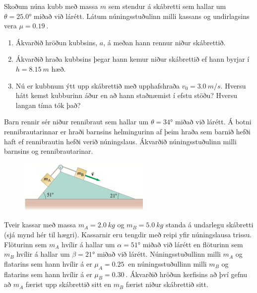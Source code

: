 \begin{enumerate}[label = \textbf{Dæmi \thechapter.\arabic*.}]
\item Skoðum núna kubb með massa $m$ sem stendur á skábretti sem hallar um $\theta = \ang{25.0}$ miðað við lárétt. Látum núningsstuðulinn milli kassans og undirlagsins vera $\mu = \SI{0.19}{}$.
\begin{enumerate}[label = \textbf{(\alph*)}]
    \item Ákvarðið hröðun kubbsins, $a$, á meðan hann rennur niður skábrettið.
    
    \item Ákvarðið hraða kubbsins þegar hann kemur niður skábrettið ef hann byrjar í $h = \SI{8.15}{m}$ hæð.
    
    \item Nú er kubbnum ýtt upp skábrettið með upphafshraða $v_0 = \SI{3.0}{m/s}$. Hversu hátt kemst kubburinn áður en að hann staðnæmist  í efstu stöðu? Hversu langan tíma tók það?
\end{enumerate}


\item Barn rennir sér niður rennibraut sem hallar um $\theta = \ang{34}$ miðað við lárétt. Á botni rennibrautarinnar er hraði barnsins helmingurinn af þeim hraða sem barnið hefði haft ef rennibrautin hefði verið núningslaus. Ákvarðið núningsstuðulinn milli barnsins og rennibrautarinar.

\vspace{0.3cm}

\begin{minipage}{\linewidth}
\begin{figure}
\vspace{0.5cm}
\includegraphics[width=2.5in]{images/skabr4.png}
\end{figure}

\item Tveir kassar með massa $m_A = \SI{2.0}{kg}$ og $m_B = \SI{5.0}{kg}$ standa á undarlegu skábretti (sjá mynd hér til hægri). Kassarnir eru tengdir með reipi yfir núningslausa trissu. Flöturinn sem $m_A$ hvílir á hallar um $\alpha = \ang{51}$ miðað við lárétt en flöturinn sem $m_B$ hvílir á hallar um $\beta = \ang{21}$ miðað við lárétt. Núningsstuðullinn milli $m_A$ og flatarins sem hann hvílir á er $\mu_A = \SI{0.25}{}$ en núningsstuðullinn milli $m_B$ og flatarins sem hann hvílir á er $\mu_B = \SI{0.30}{}$. Ákvarðið hröðun kerfisins að því gefnu að $m_A$ færist upp skábrettið sitt en $m_B$ færist niður skábrettið sitt.
\end{minipage}


\end{enumerate}
